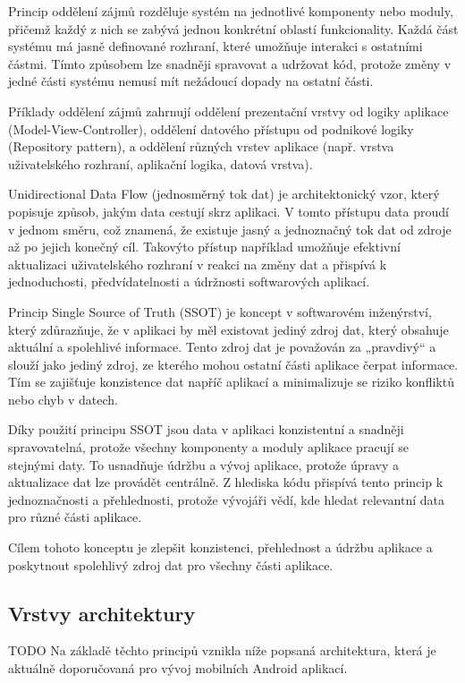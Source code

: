 Princip oddělení zájmů rozděluje systém na jednotlivé komponenty nebo moduly, přičemž každý z nich se zabývá jednou konkrétní 
oblastí funkcionality. Každá část systému má jasně definované rozhraní, které umožňuje interakci s ostatními částmi. 
Tímto způsobem lze snadněji spravovat a udržovat kód, protože změny v jedné části systému nemusí mít nežádoucí dopady na ostatní části.

Příklady oddělení zájmů zahrnují oddělení prezentační vrstvy od logiky aplikace (Model-View-Controller), oddělení datového přístupu od 
podnikové logiky (Repository pattern), a oddělení různých vrstev aplikace (např. vrstva uživatelského rozhraní, aplikační logika, datová vrstva). 

Unidirectional Data Flow (jednosměrný tok dat) je architektonický vzor, který popisuje způsob, jakým data cestují skrz aplikaci. 
V tomto přístupu data proudí v jednom směru, což znamená, že existuje jasný a jednoznačný tok dat od zdroje až po jejich konečný cíl.
Takovýto přístup například umožňuje efektivní aktualizaci uživatelského rozhraní v reakci na změny dat a přispívá k jednoduchosti, 
předvídatelnosti a údržnosti softwarových aplikací.

Princip Single Source of Truth (SSOT) je koncept v softwarovém inženýrství, který zdůrazňuje, že v aplikaci by měl existovat jediný 
zdroj dat, který obsahuje aktuální a spolehlivé informace. Tento zdroj dat je považován za „pravdivý“ a slouží jako jediný zdroj, 
ze kterého mohou ostatní části aplikace čerpat informace. Tím se zajišťuje konzistence dat napříč aplikací a minimalizuje se riziko 
konfliktů nebo chyb v datech.

Díky použití principu SSOT jsou data v aplikaci konzistentní a snadněji spravovatelná, protože všechny komponenty a moduly aplikace pracují se stejnými 
daty. To usnadňuje údržbu a vývoj aplikace, protože úpravy a aktualizace dat lze provádět centrálně. Z hlediska kódu přispívá tento
princip k jednoznačnosti a přehlednosti, protože vývojáři vědí, kde hledat relevantní data pro různé části aplikace.

Cílem tohoto konceptu je zlepšit konzistenci, přehlednost a údržbu aplikace a poskytnout spolehlivý zdroj dat pro všechny části aplikace.


\subsection*{Vrstvy architektury} \label{vrstvyArchitekturySection} 
TODO %
Na základě těchto principů vznikla níže popsaná architektura, která je aktuálně doporučovaná pro vývoj mobilních Android aplikací.

